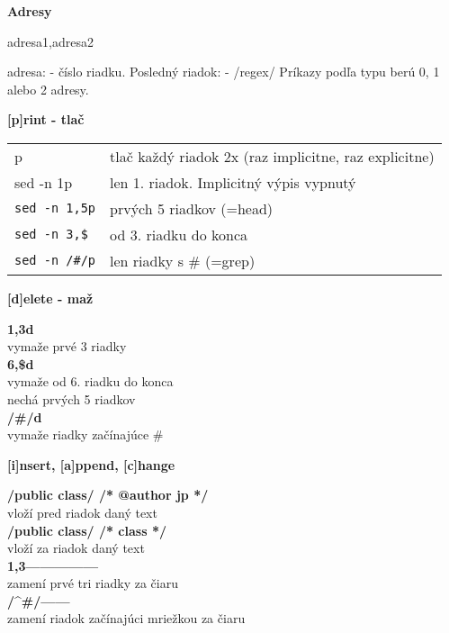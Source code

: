\documentclass[8pt,landscape]{extarticle}
\newcommand{\Heading}[1]{%
{\begin{center}\bfseries\Large#1\end{center}}%
}%
\newcommand{\Em}[1]{\Ovalbox{#1}}
\newenvironment{karticka}[1]%
{%
\Heading{#1}%
}%
{%
\clearpage
}%
\begin{document}
\begin{karticka}{Adresy}
\begin{middlecolorbox}
adresa1,adresa2\Em{príkaz}
\end{middlecolorbox}
\begin{obsah}
adresa: 
- číslo riadku. Posledný riadok: \Em{\$}
- /regex/
Príkazy podľa typu berú 0, 1 alebo 2 adresy.
\end{obsah}
\end{karticka}
\begin{karticka}{[p]rint - tlač}
\renewcommand{\arraystretch}{1.52}
\begin{tabular}{p{2.5cm}p{5.5cm}}
p            & tlač každý riadok 2x 
               (raz implicitne, raz  
               explicitne)\\
sed -n 1p    & len 1. riadok. Implicitný  
               výpis vypnutý
               \\
\verb|sed -n 1,5p| & prvých 5 riadkov (=head)
\\
\verb|sed -n 3,$|   & od 3. riadku do konca
\\
\verb|sed -n /#/p|  & len riadky s \# (=grep)
\end{tabular}
\end{karticka}
\begin{karticka}{[d]elete - maž}
\def\CRLF{\\[3pt]}
\def\NEWLINE{\\\phantom{XXX}}
\newcommand{\PRIKAZ}[1]{\textbf{#1}\\\phantom{XXX}}

\PRIKAZ{1,3d}
vymaže prvé 3 riadky\CRLF
\PRIKAZ{6,\$d}
vymaže od 6. riadku do konca \\
nechá prvých 5 riadkov\CRLF
\PRIKAZ{/\#/d}
vymaže riadky začínajúce \#

\end{karticka}
\begin{karticka}{[i]nsert, [a]ppend, [c]hange}
\def\CRLF{\\[3pt]}
\def\NEWLINE{\\\phantom{XXX}}
\newcommand{\PRIKAZ}[1]{\textbf{#1}\\\phantom{XXX}}

\PRIKAZ{/public class/\Em{i} /* @author jp */}
vloží pred riadok daný text\CRLF
\PRIKAZ{/public class/\Em{a} /* class */}
vloží za riadok daný text\CRLF
\PRIKAZ{1,3\Em{c}---------------}
zamení prvé tri riadky za čiaru\CRLF
\PRIKAZ{/\textasciicircum\#/\Em{c}------}
zamení riadok začínajúci mriežkou za čiaru

\end{karticka}
\end{document}
